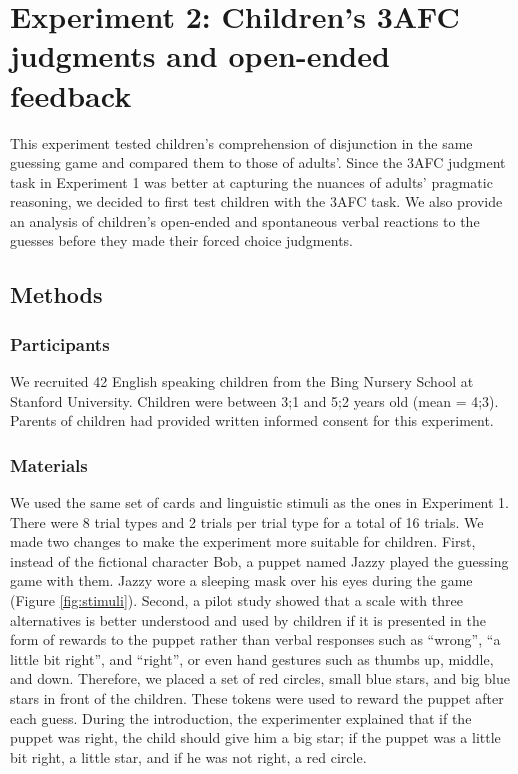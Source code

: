 \documentclass[
  english,
  ,man,floatsintext]{apa6}
\begin{document}
\hypertarget{study2}{%
\section{Experiment 2: Children's 3AFC judgments and open-ended feedback}\label{study2}}

This experiment tested children's comprehension of disjunction in the same guessing game and compared them to those of adults'. Since the 3AFC judgment task in Experiment 1 was better at capturing the nuances of adults' pragmatic reasoning, we decided to first test children with the 3AFC task. We also provide an analysis of children's open-ended and spontaneous verbal reactions to the guesses before they made their forced choice judgments.

\hypertarget{methods-1}{%
\subsection{Methods}\label{methods-1}}

\hypertarget{participants-1}{%
\subsubsection{Participants}\label{participants-1}}

We recruited 42 English speaking children from the Bing Nursery School at Stanford University. Children were between 3;1 and 5;2 years old (mean = 4;3). Parents of children had provided written informed consent for this experiment.

\hypertarget{materials}{%
\subsubsection{Materials}\label{materials}}

We used the same set of cards and linguistic stimuli as the ones in Experiment 1. There were 8 trial types and 2 trials per trial type for a total of 16 trials. We made two changes to make the experiment more suitable for children. First, instead of the fictional character Bob, a puppet named Jazzy played the guessing game with them. Jazzy wore a sleeping mask over his eyes during the game (Figure \ref{fig:stimuli}). Second, a pilot study showed that a scale with three alternatives is better understood and used by children if it is presented in the form of rewards to the puppet rather than verbal responses such as \enquote{wrong}, \enquote{a little bit right}, and \enquote{right}, or even hand gestures such as thumbs up, middle, and down. Therefore, we placed a set of red circles, small blue stars, and big blue stars in front of the children. These tokens were used to reward the puppet after each guess. During the introduction, the experimenter explained that if the puppet was right, the child should give him a big star; if the puppet was a little bit right, a little star, and if he was not right, a red circle.
\end{document}
